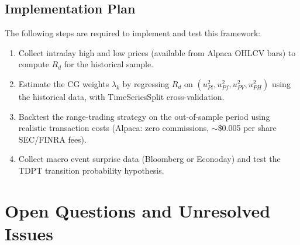 \documentclass[preprint,12pt]{elsarticle}
\begin{document}
\subsection{Implementation Plan}

The following steps are required to implement and test this framework:
\begin{enumerate}
    \item Collect intraday high and low prices (available from Alpaca OHLCV bars) to compute $R_d$ for the historical sample.
    \item Estimate the CG weights $\lambda_k$ by regressing $R_d$ on $(u_{Pt}^2, u_{Pf}^2, u_{PV}^2, u_{PH}^2)$ using the historical data, with TimeSeriesSplit cross-validation.
    \item Backtest the range-trading strategy on the out-of-sample period using realistic transaction costs (Alpaca: zero commissions, $\sim$\$0.005 per share SEC/FINRA fees).
    \item Collect macro event surprise data (Bloomberg or Econoday) and test the TDPT transition probability hypothesis.
\end{enumerate}

\section{Open Questions and Unresolved Issues}
\end{document}
